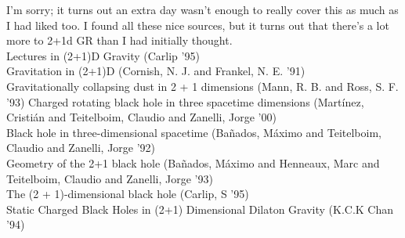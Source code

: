 \documentclass[12pt]{article}
\begin{document}
\vspace{10em}
I'm sorry; it turns out an extra day wasn't enough to really cover this as much as I had liked too. I found all these nice sources, but it turns out that there's a lot more to 2+1d GR than I had initially thought. \\
\noindent Lectures in (2+1)D Gravity (Carlip '95) \cite{carlipLec} \\
Gravitation in (2+1)D (Cornish, N. J. and Frankel, N. E. '91) \cite{cornish} \\
Gravitationally collapsing dust in 2 + 1 dimensions (Mann, R. B. and Ross, S. F. '93) \cite{mann93}
Charged rotating black hole in three spacetime dimensions (Martínez, Cristián and Teitelboim, Claudio and Zanelli, Jorge '00)\cite{martinez} \\
Black hole in three-dimensional spacetime (Bañados, Máximo and Teitelboim, Claudio and Zanelli, Jorge '92) \cite{banados92} \\
Geometry of the 2+1 black hole (Bañados, Máximo and Henneaux, Marc and Teitelboim, Claudio and Zanelli, Jorge '93) \cite{banados93} \\
The (2 + 1)-dimensional black hole (Carlip, S '95) \cite{carlip95} \\
Static Charged Black Holes in (2+1) Dimensional Dilaton Gravity (K.C.K Chan '94) \cite{chan} \\

\printbibliography
\end{document}

